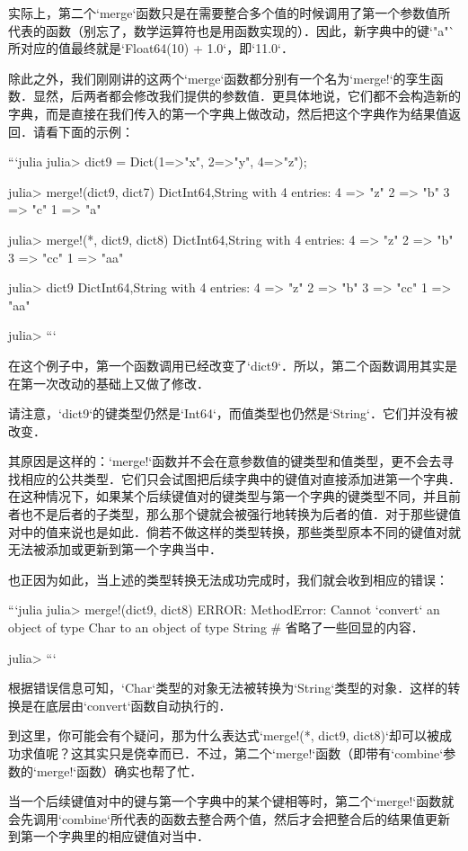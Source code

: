 实际上，第二个`merge`函数只是在需要整合多个值的时候调用了第一个参数值所代表的函数（别忘了，数学运算符也是用函数实现的）．因此，新字典中的键`"a"`所对应的值最终就是`Float64(10) + 1.0`，即`11.0`．

除此之外，我们刚刚讲的这两个`merge`函数都分别有一个名为`merge!`的孪生函数．显然，后两者都会修改我们提供的参数值．更具体地说，它们都不会构造新的字典，而是直接在我们传入的第一个字典上做改动，然后把这个字典作为结果值返回．请看下面的示例：

```julia
julia> dict9 = Dict(1=>"x", 2=>"y", 4=>"z");

julia> merge!(dict9, dict7)
Dict{Int64,String} with 4 entries:
  4 => "z"
  2 => "b"
  3 => "c"
  1 => "a"

julia> merge!(*, dict9, dict8)
Dict{Int64,String} with 4 entries:
  4 => "z"
  2 => "b"
  3 => "cc"
  1 => "aa"

julia> dict9
Dict{Int64,String} with 4 entries:
  4 => "z"
  2 => "b"
  3 => "cc"
  1 => "aa"

julia> 
```

在这个例子中，第一个函数调用已经改变了`dict9`．所以，第二个函数调用其实是在第一次改动的基础上又做了修改．

请注意，`dict9`的键类型仍然是`Int64`，而值类型也仍然是`String`．它们并没有被改变．

其原因是这样的：`merge!`函数并不会在意参数值的键类型和值类型，更不会去寻找相应的公共类型．它们只会试图把后续字典中的键值对直接添加进第一个字典．在这种情况下，如果某个后续键值对的键类型与第一个字典的键类型不同，并且前者也不是后者的子类型，那么那个键就会被强行地转换为后者的值．对于那些键值对中的值来说也是如此．倘若不做这样的类型转换，那些类型原本不同的键值对就无法被添加或更新到第一个字典当中．

也正因为如此，当上述的类型转换无法成功完成时，我们就会收到相应的错误：

```julia
julia> merge!(dict9, dict8)
ERROR: MethodError: Cannot `convert` an object of type Char to an object of type String
# 省略了一些回显的内容．

julia> 
```

根据错误信息可知，`Char`类型的对象无法被转换为`String`类型的对象．这样的转换是在底层由`convert`函数自动执行的．

到这里，你可能会有个疑问，那为什么表达式`merge!(*, dict9, dict8)`却可以被成功求值呢？这其实只是侥幸而已．不过，第二个`merge!`函数（即带有`combine`参数的`merge!`函数）确实也帮了忙．

当一个后续键值对中的键与第一个字典中的某个键相等时，第二个`merge!`函数就会先调用`combine`所代表的函数去整合两个值，然后才会把整合后的结果值更新到第一个字典里的相应键值对当中．

